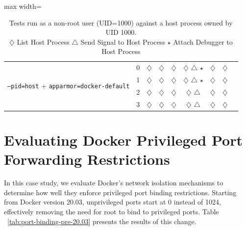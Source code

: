 \documentclass[12pt]{report}
\begin{document}
\begin{doublespace}
\begin{table}[!h]
\begin{adjustbox}{max width=\textwidth}
\begin{tabular}{|l|c|c|c|c|c|c|c|c|}
        \multirow{4}{*}{\texttt{--pid=host} + \texttt{apparmor=docker-default}} 
            & 0 & $\diamondsuit$ & $\diamondsuit$ & $\diamondsuit$ & $\diamondsuit$ $\triangle$ $\star$ & $\diamondsuit$ & $\diamondsuit$ \\
            & 1 & $\diamondsuit$ & $\diamondsuit$ & $\diamondsuit$ & $\diamondsuit$ $\triangle$ $\star$ & $\diamondsuit$ & $\diamondsuit$ \\
            & 2 & $\diamondsuit$ & $\diamondsuit$ & $\diamondsuit$ & $\diamondsuit$ $\triangle$ & $\diamondsuit$ & $\diamondsuit$ \\
            & 3 & $\diamondsuit$ & $\diamondsuit$ & $\diamondsuit$ & $\diamondsuit$ $\triangle$ & $\diamondsuit$ & $\diamondsuit$ \\
        \hline
    \end{tabular}
    \end{adjustbox}
    \caption*{
        Tests run as a non-root user (UID=1000) against a host process owned by UID 1000.\\
        $\diamondsuit$ List Host Process \quad 
        $\triangle$ Send Signal to Host Process \quad 
        $\star$ Attach Debugger to Host Process
    }
\end{table}
























\section{Evaluating Docker Privileged Port Forwarding Restrictions}

In this case study, we evaluate Docker's network isolation mechanisms to determine how well they enforce privileged port binding restrictions. Starting from Docker version 20.03, unprivileged ports start at 0 instead of 1024, effectively removing the need for root to bind to privileged ports. Table ~\ref{tab:port-binding-pre-20.03} presents the results of this change.


\end{doublespace}
\end{document}
